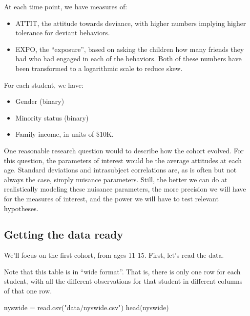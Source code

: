 \documentclass[
  letterpaper,
  DIV=11,
  numbers=noendperiod]{scrreprt}
\newenvironment{Shaded}{\begin{snugshade}}{\end{snugshade}}
\newcommand{\FunctionTok}[1]{\textcolor[rgb]{0.02,0.16,0.49}{#1}}
\newcommand{\NormalTok}[1]{\textcolor[rgb]{0.00,0.44,0.13}{#1}}
\newcommand{\OtherTok}[1]{\textcolor[rgb]{0.00,0.44,0.13}{#1}}
\newcommand{\StringTok}[1]{\textcolor[rgb]{0.25,0.44,0.63}{#1}}
\providecommand{\tightlist}{%
  \setlength{\itemsep}{0pt}\setlength{\parskip}{0pt}}\usepackage{longtable,booktabs,array}
\begin{document}
At each time point, we have measures of:

\begin{itemize}
\tightlist
\item
  ATTIT, the attitude towards deviance, with higher numbers implying
  higher tolerance for deviant behaviors.
\item
  EXPO, the ``exposure'', based on asking the children how many friends
  they had who had engaged in each of the behaviors. Both of these
  numbers have been transformed to a logarithmic scale to reduce skew.
\end{itemize}

For each student, we have:

\begin{itemize}
\tightlist
\item
  Gender (binary)
\item
  Minority status (binary)
\item
  Family income, in units of \$10K.
\end{itemize}

One reasonable research question would to describe how the cohort
evolved. For this question, the parameters of interest would be the
average attitudes at each age. Standard deviations and intrasubject
correlations are, as is often but not always the case, simply nuisance
parameters. Still, the better we can do at realistically modeling these
nuisance parameters, the more precision we will have for the measures of
interest, and the power we will have to test relevant hypotheses.

\hypertarget{getting-the-data-ready-1}{%
\subsection{Getting the data ready}\label{getting-the-data-ready-1}}

We'll focus on the first cohort, from ages 11-15. First, let's read the
data.

Note that this table is in ``wide format''. That is, there is only one
row for each student, with all the different observations for that
student in different columns of that one row.

\begin{Shaded}
\begin{Highlighting}[]
\NormalTok{nyswide }\OtherTok{=} \FunctionTok{read.csv}\NormalTok{(}\StringTok{"data/nyswide.csv"}\NormalTok{)}
\FunctionTok{head}\NormalTok{(nyswide)}
\end{Highlighting}
\end{Shaded}
\end{document}
